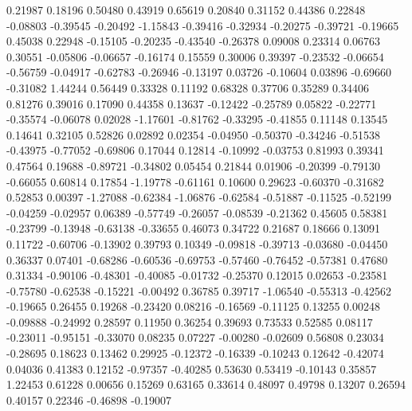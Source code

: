    0.21987  0.18196
   0.50480  0.43919
   0.65619  0.20840
   0.31152  0.44386
   0.22848 -0.08803
  -0.39545 -0.20492
  -1.15843 -0.39416
  -0.32934 -0.20275
  -0.39721 -0.19665
   0.45038  0.22948
  -0.15105 -0.20235
  -0.43540 -0.26378
   0.09008  0.23314
   0.06763  0.30551
  -0.05806 -0.06657
  -0.16174  0.15559
   0.30006  0.39397
  -0.23532 -0.06654
  -0.56759 -0.04917
  -0.62783 -0.26946
  -0.13197  0.03726
  -0.10604  0.03896
  -0.69660 -0.31082
   1.44244  0.56449
   0.33328  0.11192
   0.68328  0.37706
   0.35289  0.34406
   0.81276  0.39016
   0.17090  0.44358
   0.13637 -0.12422
  -0.25789  0.05822
  -0.22771 -0.35574
  -0.06078  0.02028
  -1.17601 -0.81762
  -0.33295 -0.41855
   0.11148  0.13545
   0.14641  0.32105
   0.52826  0.02892
   0.02354 -0.04950
  -0.50370 -0.34246
  -0.51538 -0.43975
  -0.77052 -0.69806
   0.17044  0.12814
  -0.10992 -0.03753
   0.81993  0.39341
   0.47564  0.19688
  -0.89721 -0.34802
   0.05454  0.21844
   0.01906 -0.20399
  -0.79130 -0.66055
   0.60814  0.17854
  -1.19778 -0.61161
   0.10600  0.29623
  -0.60370 -0.31682
   0.52853  0.00397
  -1.27088 -0.62384
  -1.06876 -0.62584
  -0.51887 -0.11525
  -0.52199 -0.04259
  -0.02957  0.06389
  -0.57749 -0.26057
  -0.08539 -0.21362
   0.45605  0.58381
  -0.23799 -0.13948
  -0.63138 -0.33655
   0.46073  0.34722
   0.21687  0.18666
   0.13091  0.11722
  -0.60706 -0.13902
   0.39793  0.10349
  -0.09818 -0.39713
  -0.03680 -0.04450
   0.36337  0.07401
  -0.68286 -0.60536
  -0.69753 -0.57460
  -0.76452 -0.57381
   0.47680  0.31334
  -0.90106 -0.48301
  -0.40085 -0.01732
  -0.25370  0.12015
   0.02653 -0.23581
  -0.75780 -0.62538
  -0.15221 -0.00492
   0.36785  0.39717
  -1.06540 -0.55313
  -0.42562 -0.19665
   0.26455  0.19268
  -0.23420  0.08216
  -0.16569 -0.11125
   0.13255  0.00248
  -0.09888 -0.24992
   0.28597  0.11950
   0.36254  0.39693
   0.73533  0.52585
   0.08117 -0.23011
  -0.95151 -0.33070
   0.08235  0.07227
  -0.00280 -0.02609
   0.56808  0.23034
  -0.28695  0.18623
   0.13462  0.29925
  -0.12372 -0.16339
  -0.10243  0.12642
  -0.42074  0.04036
   0.41383  0.12152
  -0.97357 -0.40285
   0.53630  0.53419
  -0.10143  0.35857
   1.22453  0.61228
   0.00656  0.15269
   0.63165  0.33614
   0.48097  0.49798
   0.13207  0.26594
   0.40157  0.22346
  -0.46898 -0.19007
